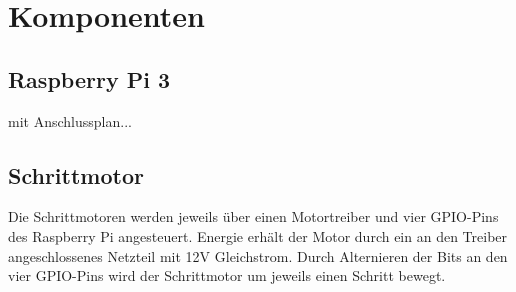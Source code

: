 \chapter{Komponenten}
\section{Raspberry Pi 3}
mit Anschlussplan...

\section{Schrittmotor}
Die Schrittmotoren werden jeweils über einen Motortreiber und vier GPIO-Pins des Raspberry Pi angesteuert. Energie erhält der Motor durch ein an den Treiber angeschlossenes Netzteil mit 12V Gleichstrom. Durch Alternieren der Bits an den vier GPIO-Pins wird der Schrittmotor um jeweils einen Schritt bewegt. 

